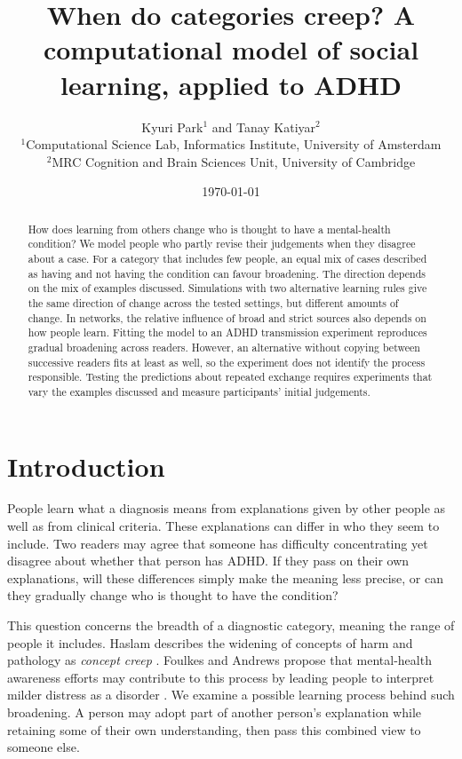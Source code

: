 \documentclass[11pt]{article}
\title{When do categories creep? A computational model of social learning, applied to ADHD}
\author{
Kyuri Park$^{1}$ and Tanay Katiyar$^{2}$\\[6pt]
{\small $^{1}$Computational Science Lab, Informatics Institute, University of Amsterdam}\\[2pt]
{\small $^{2}$MRC Cognition and Brain Sciences Unit, University of Cambridge}
}
\date{\today}
\begin{document}
\maketitle

\begin{abstract}
\noindent How does learning from others change who is thought to have a mental-health condition? We model people who partly revise their judgements when they disagree about a case. For a category that includes few people, an equal mix of cases described as having and not having the condition can favour broadening. The direction depends on the mix of examples discussed. Simulations with two alternative learning rules give the same direction of change across the tested settings, but different amounts of change. In networks, the relative influence of broad and strict sources also depends on how people learn. Fitting the model to an ADHD transmission experiment reproduces gradual broadening across readers. However, an alternative without copying between successive readers fits at least as well, so the experiment does not identify the process responsible. Testing the predictions about repeated exchange requires experiments that vary the examples discussed and measure participants' initial judgements.
\end{abstract}

\section{Introduction}

People learn what a diagnosis means from explanations given by other people as well as from clinical criteria. These explanations can differ in who they seem to include. Two readers may agree that someone has difficulty concentrating yet disagree about whether that person has ADHD. If they pass on their own explanations, will these differences simply make the meaning less precise, or can they gradually change who is thought to have the condition?

This question concerns the breadth of a diagnostic category, meaning the range of people it includes. Haslam describes the widening of concepts of harm and pathology as \emph{concept creep} \citep{haslam2016}. Foulkes and Andrews propose that mental-health awareness efforts may contribute to this process by leading people to interpret milder distress as a disorder \citep{foulkes2023}. We examine a possible learning process behind such broadening. A person may adopt part of another person's explanation while retaining some of their own understanding, then pass this combined view to someone else.
\end{document}
